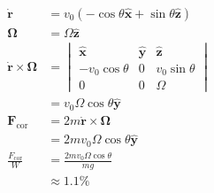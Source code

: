 \documentclass{article}
\renewcommand{\vec}[1]{\boldsymbol{\mathbf{#1}}}
\newcommand{\dvec}[1]{\dot{\vec{#1}}}
\newcommand{\uvec}[1]{\hat{\vec{#1}}}
\begin{document}
\begin{align*}
  \dvec{r}                     & = v_0 (-\cos \theta \uvec{x} + \sin \theta \uvec{z}) \\
  \vec{\Omega}                 & = \Omega \uvec{z}                                    \\
  \dvec{r} \times \vec{\Omega} & = \begin{vmatrix}
                                     \uvec{x}         & \uvec{y} & \uvec{z}        \\
                                     -v_0 \cos \theta & 0        & v_0 \sin \theta \\
                                     0                & 0        & \Omega
                                   \end{vmatrix}      \\
                               & = v_0 \Omega \cos \theta \uvec{y}                    \\
  \vec{F}_\text{cor}           & = 2 m \dvec{r} \times \vec{\Omega}                   \\
                               & = 2 m v_0 \Omega \cos \theta \uvec{y}                \\
  \frac{F_\text{cor}}{W}       & = \frac{2 m v_0 \Omega \cos \theta}{m g}             \\
                               & \approx 1.1\%
\end{align*}
\end{document}
